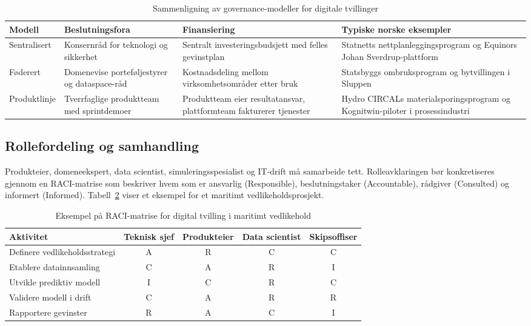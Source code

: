 \begin{table}[h]
    \centering
    \caption{Sammenligning av governance-modeller for digitale tvillinger}
    \label{tab:governance-sammenligning}
    \begin{tabular}{p{2.9cm}p{3.2cm}p{3.2cm}p{3.5cm}}
        \toprule
        Modell & Beslutningsfora & Finansiering & Typiske norske eksempler \\
        \midrule
        Sentralisert & Konsernråd for teknologi og sikkerhet & Sentralt investeringsbudsjett med felles gevinstplan & Statnetts nettplanleggingsprogram og Equinors Johan Sverdrup-plattform\citep{statnett2023digital,equinor2021johansverdrup} \\
        Føderert & Domenevise porteføljestyrer og dataspace-råd & Kostnadsdeling mellom virksomhetsområder etter bruk & Statsbyggs ombruksprogram og bytvillingen i Sluppen\citep{statsbygg2023loopfront,trondheim2024bytvilling} \\
        Produktlinje & Tverrfaglige produktteam med sprintdemoer & Produktteam eier resultatansvar, plattformteam fakturerer tjenester & Hydro CIRCALs materialsporingsprogram og Kognitwin-piloter i prosessindustri\citep{hydro2023traceability,kongsberg2023kognitwin} \\
        \bottomrule
    \end{tabular}
\end{table}

\subsection*{Rollefordeling og samhandling}
Produkteier, domeneekspert, data scientist, simuleringsspesialist og IT-drift må samarbeide tett. Rolleavklaringen bør konkretiseres gjennom en RACI-matrise som beskriver hvem som er ansvarlig (Responsible), beslutningstaker (Accountable), rådgiver (Consulted) og informert (Informed). Tabell~\ref{tab:raci-maritim} viser et eksempel for et maritimt vedlikeholdsprosjekt.

\begin{table}[h]
    \centering
    \caption{Eksempel på RACI-matrise for digital tvilling i maritimt vedlikehold}
    \label{tab:raci-maritim}
    \begin{tabular}{p{4cm}cccc}
        \toprule
        Aktivitet & Teknisk sjef & Produkteier & Data scientist & Skipsoffiser \\
        \midrule
        Definere vedlikeholdsstrategi & A & R & C & C \\
        Etablere datainnsamling & C & A & R & I \\
        Utvikle prediktiv modell & I & C & R & C \\
        Validere modell i drift & C & A & R & R \\
        Rapportere gevinster & R & A & C & I \\
        \bottomrule
    \end{tabular}
\end{table}


